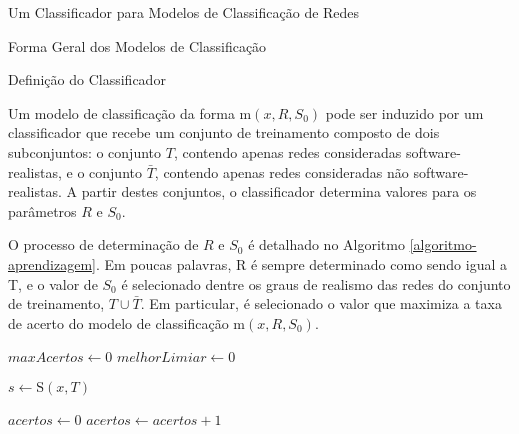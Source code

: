 \begin{section}{Um Classificador para Modelos de Classificação de Redes}
\begin{subsection}{Forma Geral dos Modelos de Classificação}
\end{subsection}

\begin{subsection}{Definição do Classificador}

	Um modelo de classificação da forma $\mathrm{m}(x, R, S_0)$ pode ser induzido por um classificador que recebe um conjunto de treinamento composto de dois subconjuntos: o conjunto $T$, contendo apenas redes consideradas software-realistas, e o conjunto $\bar{T}$, contendo apenas redes consideradas não software-realistas. A partir destes conjuntos, o classificador determina valores para os parâmetros $R$ e $S_0$. 
	
	O processo de determinação de $R$ e $S_0$ é detalhado no Algoritmo \ref{algoritmo-aprendizagem}. Em poucas palavras, R é sempre determinado como sendo igual a T, e o valor de $S_0$ é selecionado dentre os graus de realismo das redes do conjunto de treinamento, $T \cup \bar{T}$. Em particular, é selecionado o valor que maximiza a taxa de acerto do modelo de classificação $\mathrm{m}(x, R, S_0)$.
	

	
\begin{algorithm}
\caption{Algoritmo que determina os parâmetros $R$ e $S_0$ de um modelo de classificação da forma $\mbox{m}(x, R, S_0)$ a partir dos conjuntos $T$ e $\bar{T}$} \label{algoritmo-aprendizagem}
\begin{algorithmic}
\STATE $maxAcertos \gets 0$
\STATE $melhorLimiar \gets 0$

	\STATE $s \gets \mathrm{S}(x, T)$
	
	\STATE $acertos \gets 0$
			\STATE $acertos \gets acertos + 1$
		\ENDIF
	\ENDFOR
	

\end{algorithmic}
\end{algorithm}
\end{subsection}
\end{section}
